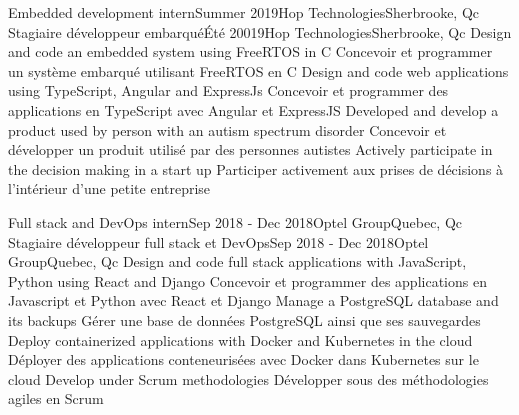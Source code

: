 \documentclass[letterpaper,11pt]{resume}
\begin{document}
    \resumeSubheadingEnFr
      {Embedded development intern}{Summer 2019}{Hop Technologies}{Sherbrooke, Qc}
      {Stagiaire développeur embarqué}{Été 20019}{Hop Technologies}{Sherbrooke, Qc}
        \resumeItemListStart
            \resumeItemEnFr
                {Design and code an embedded system using FreeRTOS in C}
                {Concevoir et programmer un système embarqué utilisant FreeRTOS en C}
            \resumeItemEnFr
                {Design and code web applications using TypeScript, Angular and ExpressJs}
                {Concevoir et programmer des applications en TypeScript avec Angular et ExpressJS}
            \resumeItemEnFr
                {Developed and develop a product used by person with an autism spectrum disorder}
                {Concevoir et développer un produit utilisé par des personnes autistes}
            \resumeItemEnFr
                {Actively participate in the decision making in a start up}
                {Participer activement aux prises de décisions à l'intérieur d'une petite entreprise}
        \resumeItemListEnd

    \resumeSubheadingEnFr
      {Full stack and DevOps intern}{Sep 2018 - Dec 2018}{Optel Group}{Quebec, Qc}
      {Stagiaire développeur full stack et DevOps}{Sep 2018 - Dec 2018}{Optel Group}{Quebec, Qc}
      \resumeItemListStart
        \resumeItemEnFr
            {Design and code full stack applications with JavaScript, Python using React and Django}
            {Concevoir et programmer des applications en Javascript et Python avec React et Django}
        \resumeItemEnFr
            {Manage a PostgreSQL database and its backups}
            {Gérer une base de données PostgreSQL ainsi que ses sauvegardes}
        \resumeItemEnFr
            {Deploy containerized applications with Docker and Kubernetes in the cloud}
            {Déployer des applications conteneurisées avec Docker dans Kubernetes sur le cloud}
        \resumeItemEnFr
            {Develop under Scrum methodologies}
            {Développer sous des méthodologies agiles en Scrum}
      \resumeItemListEnd

    \resumeSubHeadingListEnd


\end{document}
